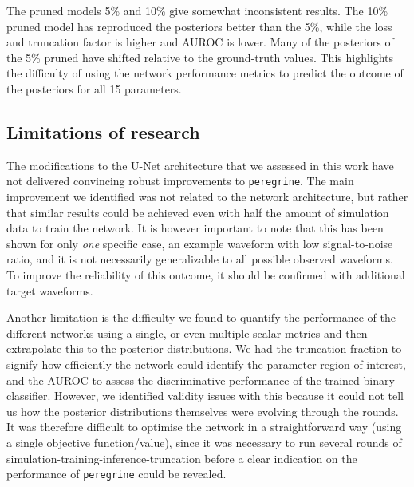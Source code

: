 The pruned models 5\% and 10\% give somewhat inconsistent results. The 10\% pruned model has reproduced the posteriors better than the 5\%, while the loss and truncation factor is higher and AUROC is lower. Many of the posteriors of the 5\% pruned have shifted relative to the ground-truth values. This highlights the difficulty of using the network performance metrics to predict the outcome of the posteriors for all 15 parameters.


\subsection{Limitations of research}

The modifications to the U-Net architecture that we assessed in this work have not delivered convincing robust improvements to \texttt{peregrine}. The main improvement we identified was not related to the network architecture, but rather that similar results could be achieved even with half the amount of simulation data to train the network. It is however important to note that this has been shown for only \textit{one} specific case, an example waveform with low signal-to-noise ratio, and it is not necessarily generalizable to all possible observed waveforms. To improve the reliability of this outcome, it should be confirmed with additional target waveforms.

Another limitation is the difficulty we found to quantify the performance of the different networks using a single, or even multiple scalar metrics and then extrapolate this to the posterior distributions. We had the truncation fraction to signify how efficiently the network could identify the parameter region of interest, and the AUROC to assess the discriminative performance of the trained binary classifier. However, we identified validity issues with this because it could not tell us how the posterior distributions themselves were evolving through the rounds. It was therefore difficult to optimise the network in a straightforward way (using a single objective function/value), since it was necessary to run several rounds of simulation-training-inference-truncation before a clear indication on the performance of \texttt{peregrine} could be revealed.

